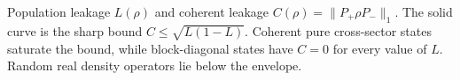\caption{Population leakage \(L(\rho)\) and coherent leakage \(C(\rho)=\|P_+\rho P_-\|_1\). The solid curve is the sharp bound \(C\le\sqrt{L(1-L)}\). Coherent pure cross-sector states saturate the bound, while block-diagonal states have \(C=0\) for every value of \(L\). Random real density operators lie below the envelope.}
